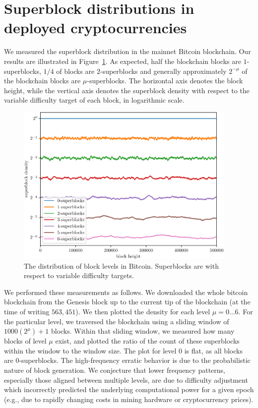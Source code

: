 \section{Superblock distributions in deployed cryptocurrencies}

We measured the superblock distribution in the mainnet Bitcoin blockchain. Our
results are illustrated in Figure~\ref{fig.btc-superblocks}. As expected,
half the blockchain blocks are $1$-superblocks, $1/4$ of blocks are
$2$-superblocks and generally approximately $2^{-\mu}$ of the blockchain blocks
are $\mu$-superblocks. The horizontal axis denotes the block height, while the
vertical axis denotes the superblock density with respect to the variable
difficulty target of each block, in logarithmic scale.

\begin{figure}[h]
\begin{center}
  \includegraphics[width=0.95\textwidth]{figures/bitcoin-superblock-distribution.pdf}
  \caption{The distribution of block levels in Bitcoin. Superblocks are with
    respect to variable difficulty targets.}
  \label{fig.btc-superblocks}
  \end{center}
\end{figure}

We performed these measurements as follows. We downloaded the whole bitcoin
blockchain from the Genesis block up to the current tip of the blockchain
(at the time of writing $563{,}451$). We then plotted the density for each level $\mu = 0 \dots 6$. For the particular level, we traversed the blockchain using
a sliding window of $1000 (2^\mu) + 1$ blocks. Within that sliding window, we
measured how many blocks of level $\mu$ exist, and plotted the ratio of the
count of these superblocks within the window to the window size. The plot for
level $0$ is flat, as all blocks are $0$-superblocks. The high-frequency erratic
behavior is due to the probabilistic nature of block generation. We conjecture
that lower frequency patterns, especially those aligned between multiple levels,
are due to difficulty adjustment which incorrectly predicted the underlying
computational power for a given epoch (e.g., due to rapidly changing costs in
mining hardware or cryptocurrency prices).
